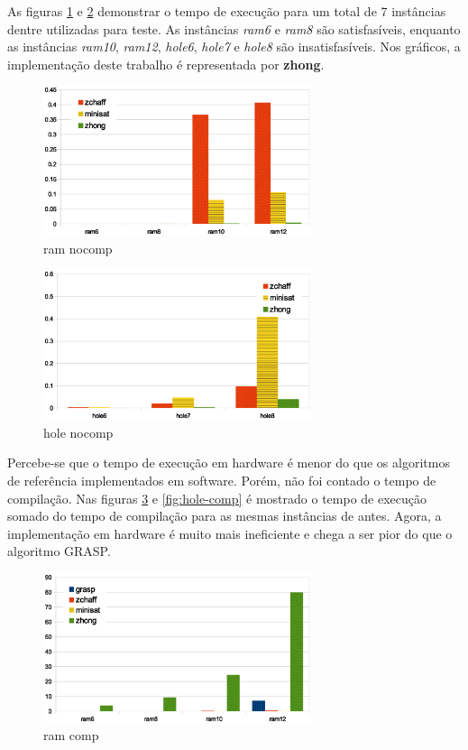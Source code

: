 \documentclass[12pt,a4paper]{article}
\begin{document}
As figuras \ref{fig:ram-nocomp} e \ref{fig:hole-nocomp} demonstrar o tempo de execução para um total de 7 instâncias dentre utilizadas para teste.
As instâncias \textit{ram6} e \textit{ram8} são satisfasíveis, enquanto as instâncias \textit{ram10}, \textit{ram12}, \textit{hole6}, \textit{hole7} e \textit{hole8} são insatisfasíveis. Nos gráficos, a implementação deste trabalho é representada por \textbf{zhong}.

\begin{figure}[H]
    \centering
    \includegraphics[width=0.7\textwidth]{figures/ram-nocomp}
    \caption{ram nocomp}
    \label{fig:ram-nocomp}
\end{figure}

\begin{figure}[H]
    \centering
    \includegraphics[width=0.7\textwidth]{figures/hole-nocomp}
    \caption{hole nocomp}
    \label{fig:hole-nocomp}
\end{figure}

Percebe-se que o tempo de execução em hardware é menor do que os algoritmos de referência implementados em software. Porém, não foi contado o tempo de compilação. Nas figuras \ref{fig:ram-comp} e \ref{fig:hole-comp} é mostrado o tempo de execução somado do tempo de compilação para as mesmas instâncias de antes. Agora, a implementação em hardware é muito mais ineficiente e chega a ser pior do que o algoritmo GRASP.

\begin{figure}[H]
    \centering
    \includegraphics[width=0.7\textwidth]{figures/ram-comp}
    \caption{ram comp}
    \label{fig:ram-comp}
\end{figure}
\end{document}

